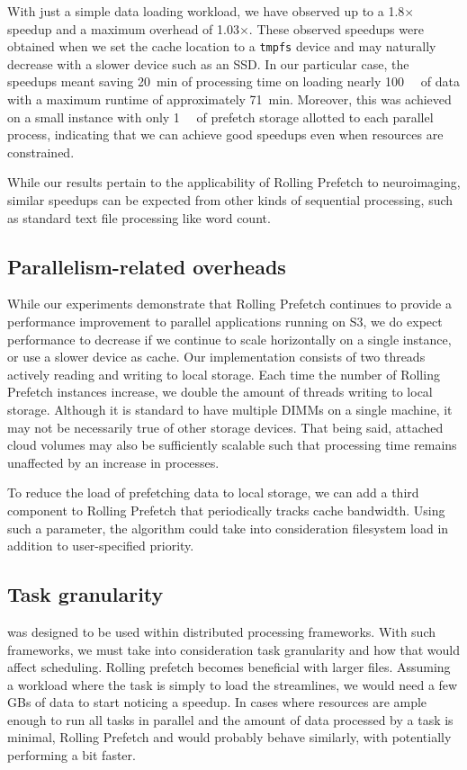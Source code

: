 With just a simple data loading workload, we have observed up to a 1.8$\times$
speedup and a maximum overhead of 1.03$\times$. These observed speedups were
obtained when we set the cache location to a \texttt{tmpfs} device and may
naturally decrease with a slower device such as an SSD. In our particular case,
the speedups meant saving 20~min of processing time on loading nearly
\SI{100}{\gibi\byte} of data with a maximum runtime of approximately 71~min.
Moreover, this was achieved on a small instance with only \SI{1}{\gibi\byte} of
prefetch storage allotted to each parallel process, indicating that we can
achieve good speedups even when resources are constrained. 

While our results pertain to the applicability of Rolling Prefetch to
neuroimaging, similar speedups can be expected from other kinds of sequential
processing, such as standard text file processing like word count.

\subsection{Parallelism-related overheads}

While our experiments demonstrate that Rolling Prefetch continues to provide a
performance improvement to parallel applications running on S3, we do expect
performance to decrease if we continue to scale horizontally on a single
instance, or use a slower device as cache. Our implementation consists of two
threads actively reading and writing to local storage. Each time the number of
Rolling Prefetch instances increase, we double the amount of threads writing to
local storage. Although it is standard to have multiple DIMMs on a single
machine, it may not be necessarily true of other storage devices. That being
said, attached cloud volumes may also be sufficiently scalable such that
processing time remains unaffected by an increase in processes.

To reduce the load of prefetching data to local storage, we can add a third
component to Rolling Prefetch that periodically tracks cache bandwidth. Using
such a parameter, the algorithm could take into consideration filesystem load in
addition to user-specified priority.


\subsection{Task granularity}
\sfs was designed to be used within distributed processing frameworks. With such
frameworks, we must take into consideration task granularity and how that would
affect scheduling. Rolling prefetch becomes beneficial with larger files.
Assuming a workload where the task is simply to load the streamlines, we would
need a few GBs of data to start noticing a speedup. In cases where resources are
ample enough to run all tasks in parallel and the amount of data processed by a
task is minimal, Rolling Prefetch and \sfs would probably behave similarly, with
\sfs potentially performing a bit faster.

